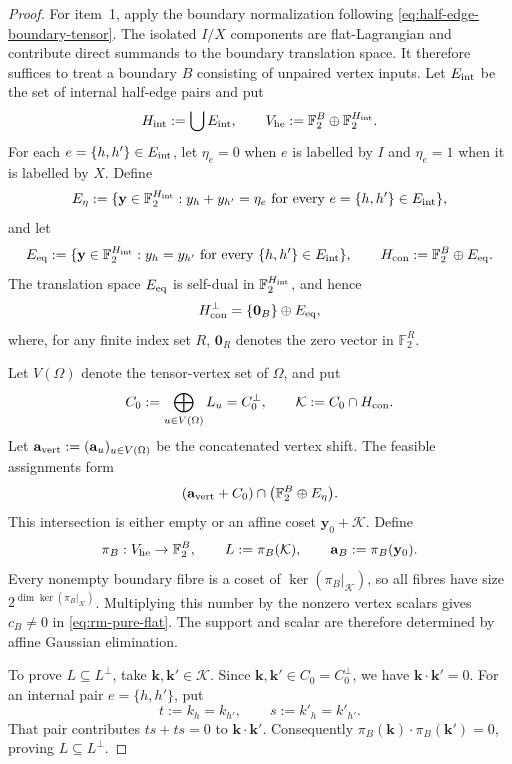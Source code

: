 \documentclass[11pt,letterpaper,onecolumn]{article}
\theoremstyle{plain}
\theoremstyle{definition}
\theoremstyle{remark}
\newcommand{\Ftwo}{\mathbb F_2}
\begin{document}
\begin{proof}
For item~1, apply the boundary normalization following
\cref{eq:half-edge-boundary-tensor}. The isolated \(I/X\) components
are flat-Lagrangian and contribute direct summands to the boundary
translation space. It therefore suffices to treat a boundary \(B\)
consisting of unpaired vertex inputs. Let \(E_{\rm int}\) be the set of internal
half-edge pairs and put
\[
 H_{\rm int}:=\bigcup E_{\rm int},
 \qquad
 V_{\rm he}:=\Ftwo^B\oplus\Ftwo^{H_{\rm int}}.
\]
For each \(e=\{h,h'\}\in E_{\rm int}\), let \(\eta_e=0\) when \(e\) is
labelled by \(I\) and \(\eta_e=1\) when it is labelled by \(X\).  Define
\[
 E_\eta:=
 \{{\mathbf{y}}\in\Ftwo^{H_{\rm int}}:
   y_h+y_{h'}=\eta_e
   \text{ for every }e=\{h,h'\}\in E_{\rm int}\},
\]
and let
\[
 E_{\rm eq}:=
 \{{\mathbf{y}}\in\Ftwo^{H_{\rm int}}:
   y_h=y_{h'}\text{ for every }\{h,h'\}\in E_{\rm int}\},
 \qquad
 H_{\rm con}:=\Ftwo^B\oplus E_{\rm eq}.
\]
The translation space \(E_{\rm eq}\) is self-dual in
\(\Ftwo^{H_{\rm int}}\), and hence
\[
 H_{\rm con}^\perp
 =\{\mathbf 0_B\}\oplus E_{\rm eq},
\]
where, for any finite index set \(R\), \(\mathbf 0_R\) denotes the zero
vector in \(\Ftwo^R\).

Let \(V(\Omega)\) denote the tensor-vertex set of \(\Omega\), and put
\[
 C_0:=
 \bigoplus_{u\in V(\Omega)}L_u
 =C_0^\perp,
 \qquad
 \mathcal K:=C_0\cap H_{\rm con}.
\]
Let \({\mathbf{a}}_{\rm vert}:=({\mathbf{a}}_u)_{u\in V(\Omega)}\) be the concatenated vertex
shift.  The feasible assignments form
\[
 ({\mathbf{a}}_{\rm vert}+C_0)
 \cap\bigl(\Ftwo^B\oplus E_\eta\bigr).
\]
This intersection is either empty or an affine coset
\({\mathbf{y}}_0+\mathcal K\).  Define
\[
 \pi_B:V_{\rm he}\to\Ftwo^B,
 \qquad
 L:=\pi_B(\mathcal K),
 \qquad
 {\mathbf{a}}_B:=\pi_B({\mathbf{y}}_0).
\]
Every nonempty boundary fibre is a coset of
\(\ker(\pi_B|_{\mathcal K})\), so all fibres have size
\(2^{\dim\ker(\pi_B|_{\mathcal K})}\).  Multiplying this number by
the nonzero vertex scalars gives \(c_B\ne0\) in
\cref{eq:rm-pure-flat}.  The support and scalar are therefore determined
by affine Gaussian elimination.

To prove \(L\subseteq L^\perp\), take \({\mathbf{k}},{\mathbf{k}}'\in\mathcal K\).  Since
\({\mathbf{k}},{\mathbf{k}}'\in C_0=C_0^\perp\), we have \({\mathbf{k}}\cdot {\mathbf{k}}'=0\).  For an internal pair
\(e=\{h,h'\}\), put
\[
 t:=k_h=k_{h'},
 \qquad
 s:=k'_h=k'_{h'}.
\]
That pair contributes \(ts+ts=0\) to \({\mathbf{k}}\cdot {\mathbf{k}}'\).  Consequently
\(\pi_B({\mathbf{k}})\cdot\pi_B({\mathbf{k}}')=0\), proving \(L\subseteq L^\perp\).


\end{proof}
\end{document}

